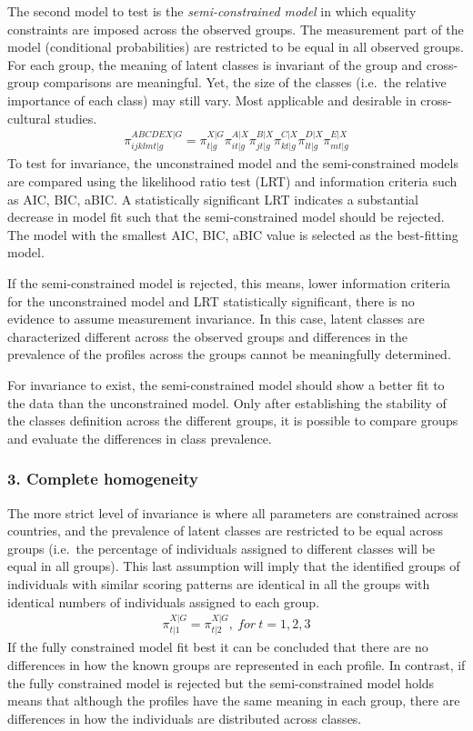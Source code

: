 \documentclass[12pt,a4paper,oneside]{reedthesis}
\begin{document}
The second model to test is the \emph{semi-constrained model} in which equality constraints are imposed across the observed groups. The measurement part of the model (conditional probabilities) are restricted to be equal in all observed groups. For each group, the meaning of latent classes is invariant of the group and cross-group comparisons are meaningful. Yet, the size of the classes (i.e.~the relative importance of each class) may still vary. Most applicable and desirable in cross-cultural studies.
\begin{align}
 \pi_{ijklmt|g}^{ABCDEX|G} = \pi_{t|g}^{X|G} \pi_{it|g}^{A|X} \pi_{jt|g}^{B|X} \pi_{kt|g}^{C|X} \pi_{lt|g}^{D|X} \pi_{mt|g}^{E|X}
\end{align}
To test for invariance, the unconstrained model and the semi-constrained models are compared using the likelihood ratio test (LRT) and information criteria such as AIC, BIC, aBIC. A statistically significant LRT indicates a substantial decrease in model fit such that the semi-constrained model should be rejected. The model with the smallest AIC, BIC, aBIC value is selected as the best-fitting model.

If the semi-constrained model is rejected, this means, lower information criteria for the unconstrained model and LRT statistically significant, there is no evidence to assume measurement invariance. In this case, latent classes are characterized different across the observed groups and differences in the prevalence of the profiles across the groups cannot be meaningfully determined.

For invariance to exist, the semi-constrained model should show a better fit to the data than the unconstrained model. Only after establishing the stability of the classes definition across the different groups, it is possible to compare groups and evaluate the differences in class prevalence.

\hypertarget{complete-homogeneity}{%
\subsubsection{3. Complete homogeneity}\label{complete-homogeneity}}

The more strict level of invariance is where all parameters are constrained across countries, and the prevalence of latent classes are restricted to be equal across groups (i.e.~the percentage of individuals assigned to different classes will be equal in all groups). This last assumption will imply that the identified groups of individuals with similar scoring patterns are identical in all the groups with identical numbers of individuals assigned to each group.
\begin{align}
\pi_{t|1}^{X|G} = \pi_{t|2}^{X|G}, \: for \: t = 1, 2, 3
\end{align}
If the fully constrained model fit best it can be concluded that there are no differences in how the known groups are represented in each profile. In contrast, if the fully constrained model is rejected but the semi-constrained model holds means that although the profiles have the same meaning in each group, there are differences in how the individuals are distributed across classes.
\end{document}
